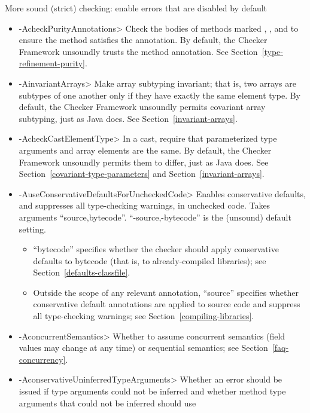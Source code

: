 \label{unsound-by-default}
More sound (strict) checking: enable errors that are disabled by default
\begin{itemize}
\item \<-AcheckPurityAnnotations>
  Check the bodies of methods marked
  ,
  ,
  and 
  to ensure the method satisfies the annotation.  By default,
  the Checker Framework unsoundly trusts the method annotation.  See
  Section~\ref{type-refinement-purity}.
\item \<-AinvariantArrays>
  Make array subtyping invariant; that is, two arrays are subtypes of one
  another only if they have exactly the same element type.  By default,
  the Checker Framework unsoundly permits covariant array subtyping, just
  as Java does.  See Section~\ref{invariant-arrays}.
\item \<-AcheckCastElementType>
  In a cast, require that parameterized type arguments and array elements
  are the same.  By default, the Checker Framework unsoundly permits them
  to differ, just as Java does.  See Section~\ref{covariant-type-parameters}
  and Section~\ref{invariant-arrays}.
\item \<-AuseConservativeDefaultsForUncheckedCode>
  Enables conservative defaults, and suppresses all type-checking warnings,
  in unchecked code.  Takes arguments ``source,bytecode''.
  ``-source,-bytecode'' is the (unsound) default setting.
  \begin{itemize}
  \item
  ``bytecode'' specifies
  whether the checker should apply conservative defaults to
  bytecode (that is, to already-compiled libraries); see
  Section~\ref{defaults-classfile}.
  \item
  Outside the scope of any relevant
   annotation, ``source'' specifies whether conservative
  default annotations are applied to source code and suppress all type-checking warnings; see
  Section~\ref{compiling-libraries}.
  \end{itemize}
\item \<-AconcurrentSemantics>
  Whether to assume concurrent semantics (field values may change at any
  time) or sequential semantics; see Section~\ref{faq-concurrency}.
\item \<-AconservativeUninferredTypeArguments>
  Whether an error should be issued if type arguments could not be inferred and
  whether method type arguments that could not be inferred should use

\end{itemize}
